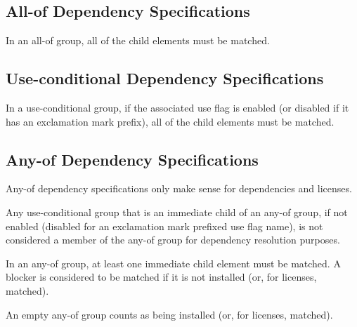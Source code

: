 \subsection{All-of Dependency Specifications}

In an all-of group, all of the child elements must be matched.

\subsection{Use-conditional Dependency Specifications}

In a use-conditional group, if the associated use flag is enabled (or disabled if it has an
exclamation mark prefix), all of the child elements must be matched.

\subsection{Any-of Dependency Specifications}

Any-of dependency specifications only make sense for dependencies and licenses.

Any use-conditional group that is an immediate child of an any-of group, if not enabled (disabled
for an exclamation mark prefixed use flag name), is not considered a member of the any-of group
for dependency resolution purposes.

In an any-of group, at least one immediate child element must be matched. A blocker is
considered to be matched if it is not installed (or, for licenses, matched).

An empty any-of group counts as being installed (or, for licenses, matched).


